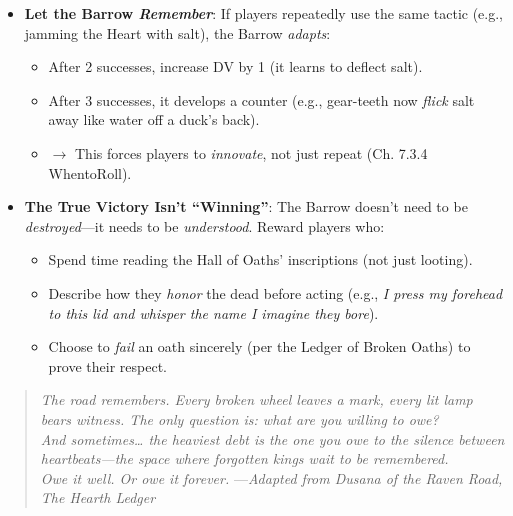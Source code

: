 \documentclass[12pt]{article}
\begin{document}
\begin{itemize}
\begin{quote}
  \end{quote}
  \item \textbf{Let the Barrow \textit{Remember}}: If players repeatedly use the same tactic (e.g., jamming the Heart with salt), the Barrow \textit{adapts}:
  \begin{itemize}
    \item After 2 successes, increase DV by 1 (it learns to deflect salt).
    \item After 3 successes, it develops a counter (e.g., gear-teeth now \textit{flick} salt away like water off a duck's back).
    \item $\rightarrow$ This forces players to \textit{innovate}, not just repeat (Ch. 7.3.4 WhentoRoll).
  \end{itemize}
  \item \textbf{The True Victory Isn't ``Winning''}: The Barrow doesn't need to be \textit{destroyed}---it needs to be \textit{understood}. Reward players who:
  \begin{itemize}
    \item Spend time reading the Hall of Oaths' inscriptions (not just looting).
    \item Describe how they \textit{honor} the dead before acting (e.g., \textit{I press my forehead to this lid and whisper the name I imagine they bore}).
    \item Choose to \textit{fail} an oath sincerely (per the Ledger of Broken Oaths) to prove their respect.
  \end{itemize}
\end{itemize}

\begin{quote}
\textit{The road remembers. Every broken wheel leaves a mark, every lit lamp bears witness. The only question is: what are you willing to owe? \\ 
And sometimes\ldots{} the heaviest debt is the one you owe to the silence between heartbeats---the space where forgotten kings wait to be remembered. \\ 
Owe it well. Or owe it forever.}
\hfill ---\textit{Adapted from Dusana of the Raven Road, The Hearth Ledger}
\end{quote}
\end{document}
